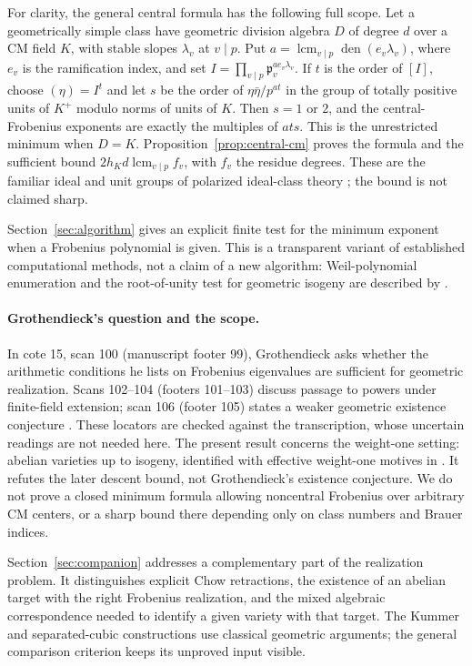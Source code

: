 \documentclass[11pt,a4paper]{article}
\newcommand{\pp}{\mathfrak p}
\theoremstyle{definition}
\theoremstyle{remark}
\begin{document}
For clarity, the general central formula has the following full
scope. Let a geometrically simple class have geometric division
algebra $D$ of degree $d$ over a CM field $K$, with stable slopes
$\lambda_v$ at $v\mid p$. Put
$a=\operatorname{lcm}_{v\mid p}\operatorname{den}(e_v\lambda_v)$,
where $e_v$ is the ramification index, and set
$I=\prod_{v\mid p}\pp_v^{ae_v\lambda_v}$. If $t$ is the order
of $[I]$, choose $(\eta)=I^t$ and let $s$ be the order of
$\eta\bar\eta/p^{at}$ in the group of totally positive units
of $K^+$ modulo norms of units of $K$. Then $s=1$ or $2$, and
the central-Frobenius exponents are exactly the multiples of $ats$.
This is the unrestricted minimum when $D=K$.
Proposition~\ref{prop:central-cm} proves the formula and the
sufficient bound $2h_Kd\operatorname{lcm}_{v\mid p}f_v$, with
$f_v$ the residue degrees. These are the familiar ideal and unit
groups of polarized ideal-class theory
\citep[Lemma 5.5 and \S5.3]{BrooksEtAl2017}; the bound is not
claimed sharp.

Section~\ref{sec:algorithm} gives an explicit finite test for the
minimum exponent when a Frobenius polynomial is given. This is a
transparent variant of established computational methods, not a claim
of a new algorithm: Weil-polynomial enumeration and the
root-of-unity test for geometric isogeny are described by
\citet[\S\S3.1 and 3.4, pp.~12--15]{DKRV2020}.

\paragraph{Grothendieck's question and the scope.}
In cote 15, scan 100 (manuscript footer 99), Grothendieck asks whether
the arithmetic conditions he lists on Frobenius eigenvalues are
sufficient for geometric realization. Scans 102--104 (footers
101--103) discuss passage to powers under finite-field extension;
scan 106 (footer 105) states a weaker geometric existence conjecture
\citep{GrothendieckND}. These locators are checked against the
transcription, whose uncertain readings are not needed here. The
present result concerns the weight-one setting: abelian varieties up
to isogeny, identified with effective weight-one motives in
\citet[\S1, p.~95]{Tate1971}. It refutes the later descent bound,
not Grothendieck's existence conjecture. We do not prove a closed
minimum formula allowing noncentral Frobenius over arbitrary CM
centers, or a sharp bound there depending only on class numbers and
Brauer indices.

Section~\ref{sec:companion} addresses a complementary part of the
realization problem. It distinguishes explicit Chow retractions,
the existence of an abelian target with the right Frobenius
realization, and the mixed algebraic correspondence needed to
identify a given variety with that target. The Kummer and
separated-cubic constructions use classical geometric arguments;
the general comparison criterion keeps its unproved input visible.
\end{document}
